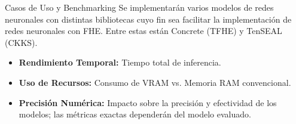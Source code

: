 \begin{frame}{Casos de Uso y Benchmarking}
    Se implementarán varios modelos de redes neuronales con distintas bibliotecas cuyo fin sea facilitar la implementación de redes neuronales con FHE. Entre estas están Concrete (TFHE) y TenSEAL (CKKS).
    \vspace{12pt}

    \begin{itemize}
        \setlength{\itemsep}{12pt}
        \item \textbf{Rendimiento Temporal:} Tiempo total de inferencia.
        \item \textbf{Uso de Recursos:} Consumo de VRAM vs. Memoria RAM convencional.
        \item \textbf{Precisión Numérica:} Impacto sobre la precisión y efectividad de los modelos; las métricas exactas dependerán del modelo evaluado.
    \end{itemize}
\end{frame}
